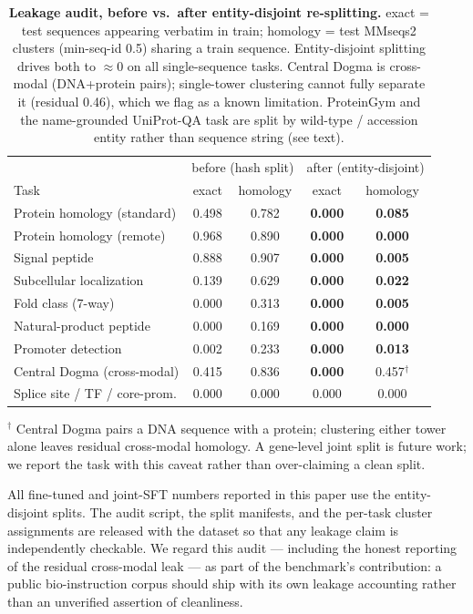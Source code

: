 \begin{table}[t]
\centering
\small
\caption{\textbf{Leakage audit, before vs.\ after entity-disjoint re-splitting.}
exact = test sequences appearing verbatim in train; homology = test MMseqs2 clusters
(min-seq-id 0.5) sharing a train sequence. Entity-disjoint splitting drives both to
$\approx$0 on all single-sequence tasks. Central Dogma is cross-modal (DNA+protein pairs);
single-tower clustering cannot fully separate it (residual 0.46), which we flag as a known
limitation. ProteinGym and the name-grounded UniProt-QA task are split by wild-type /
accession entity rather than sequence string (see text).}
\label{tab:leakage}
\begin{tabular}{lcccc}
\toprule
 & \multicolumn{2}{c}{before (hash split)} & \multicolumn{2}{c}{after (entity-disjoint)} \\
Task & exact & homology & exact & homology \\
\midrule
Protein homology (standard)  & 0.498 & 0.782 & \textbf{0.000} & \textbf{0.085} \\
Protein homology (remote)    & 0.968 & 0.890 & \textbf{0.000} & \textbf{0.000} \\
Signal peptide               & 0.888 & 0.907 & \textbf{0.000} & \textbf{0.005} \\
Subcellular localization     & 0.139 & 0.629 & \textbf{0.000} & \textbf{0.022} \\
Fold class (7-way)           & 0.000 & 0.313 & \textbf{0.000} & \textbf{0.005} \\
Natural-product peptide      & 0.000 & 0.169 & \textbf{0.000} & \textbf{0.000} \\
Promoter detection           & 0.002 & 0.233 & \textbf{0.000} & \textbf{0.013} \\
Central Dogma (cross-modal)  & 0.415 & 0.836 & \textbf{0.000} & 0.457$^{\dagger}$ \\
Splice site / TF / core-prom.& 0.000 & 0.000 & 0.000 & 0.000 \\
\bottomrule
\end{tabular}

\vspace{2pt}
{\footnotesize $^{\dagger}$ Central Dogma pairs a DNA sequence with a protein; clustering
either tower alone leaves residual cross-modal homology. A gene-level joint split is future
work; we report the task with this caveat rather than over-claiming a clean split.}
\end{table}

All fine-tuned and joint-SFT numbers reported in this paper use the entity-disjoint splits.
The audit script, the split manifests, and the per-task cluster assignments are released
with the dataset so that any leakage claim is independently checkable. We regard this audit
--- including the honest reporting of the residual cross-modal leak --- as part of the
benchmark's contribution: a public bio-instruction corpus should ship with its own leakage
accounting rather than an unverified assertion of cleanliness.
